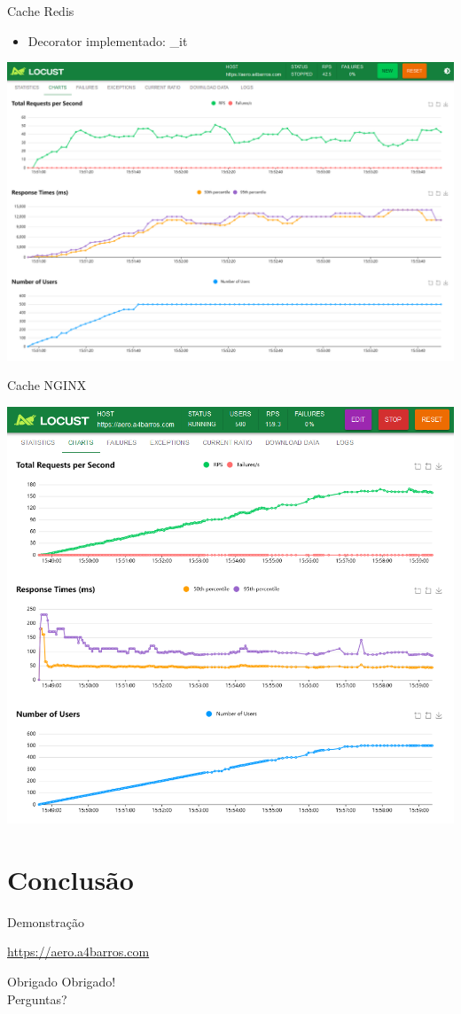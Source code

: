 \documentclass{beamer}
\begin{document}
\begin{frame}{Cache Redis}
    \begin{itemize}
        \item Decorator implementado: \@cache\_it
    \end{itemize}

    \begin{center}
    \includegraphics[width=0.6\linewidth]{img/locust-cache-redis.png}
    \end{center}
\end{frame}

\begin{frame}{Cache NGINX}
    \begin{center}
    \includegraphics[width=0.6\linewidth]{img/locust-cache.png}
    \end{center}
\end{frame}


\section{Conclusão}
\begin{frame}{Demonstração}
    \begin{center}
        \url{https://aero.a4barros.com}
    \end{center}
\end{frame}

\begin{frame}{Obrigado}
    \centering
    \Huge Obrigado! \\
    \normalsize Perguntas?
\end{frame}
\end{document}
